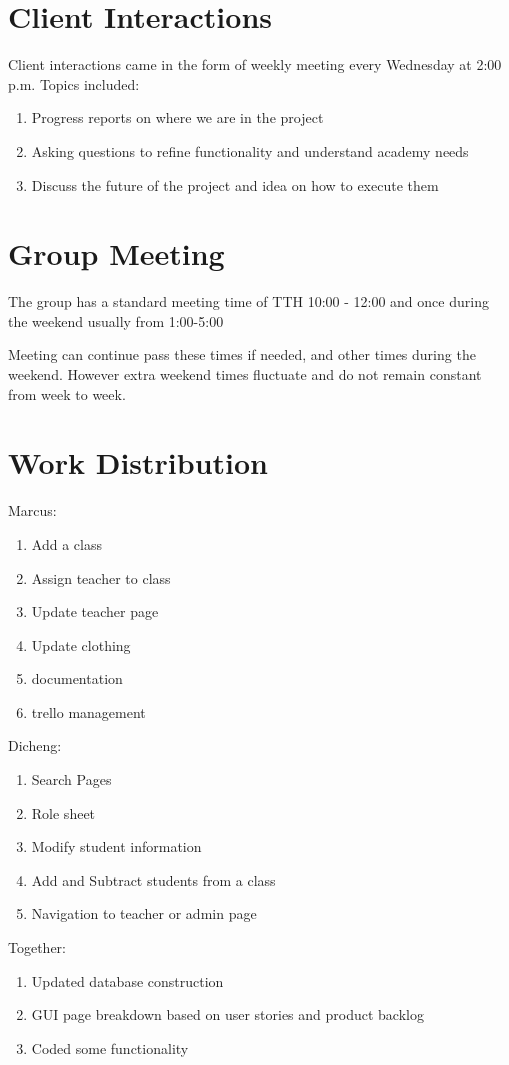 \documentclass[11pt]{book}
\begin{document}
\section{Client Interactions}

Client interactions came in the form of weekly meeting every Wednesday at 2:00 p.m. Topics included:

\begin{enumerate}
\item Progress reports on where we are in the project
\item Asking questions to refine functionality and understand academy needs
\item Discuss the future of the project and idea on how to execute them
\end{enumerate}


\section{Group Meeting}

The group has a standard meeting time of TTH 10:00 - 12:00 and once during the weekend usually from 1:00-5:00 

Meeting can continue pass these times if needed, and other times during the weekend. However extra weekend times fluctuate and do not remain constant from week to week. 

\section{Work Distribution}

Marcus:
\begin{enumerate}
\item Add a class
\item Assign teacher to class
\item Update teacher page
\item Update clothing
\item documentation
\item trello management\\
\end{enumerate}

Dicheng:
\begin{enumerate}
\item Search Pages
\item Role sheet
\item Modify student information
\item Add and Subtract students from a class
\item Navigation to teacher or admin page\\
\end{enumerate}


Together:
\begin{enumerate}
\item Updated database construction
\item GUI page breakdown based on user stories and product backlog
\item Coded some functionality
\end{enumerate}
\end{document}
